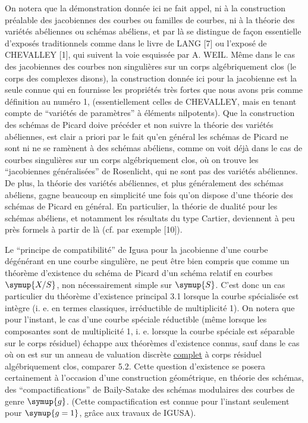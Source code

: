  On notera que la démonstration donnée ici ne fait appel,
ni à la construction préalable des jacobiennes des courbes ou familles de
courbes, ni à la théorie des variétés abéliennes ou schémas abéliens, et par là
se distingue de façon essentielle d'exposés traditionnels comme dans le livre
de LANG [7] ou l'exposé de CHEVALLEY [1], qui suivent la voie esquissée par
A. WEIL. Même dans le cas des jacobiennes des courbes non singulières sur un
corps algébriquement clos (le corps des complexes disons), la construction
donnée ici pour la jacobienne est la seule connue qui en fournisse les
propriétés très fortes que nous avons pris comme définition au numéro 1,
(essentiellement celles de CHEVALLEY, mais en tenant compte de ``variétés de
paramètres'' à éléments nilpotents). Que la construction des schémas de Picard
doive précéder et non suivre la théorie des variétés abéliennes, est clair a
priori par le fait qu'en général les schémas de Picard ne sont ni ne se
ramènent à des schémas abéliens, comme on voit déjà dans le cas de courbes
singulières sur un corps algébriquement clos, où on trouve les ``jacobiennes
généralisées'' de Rosenlicht, qui ne sont pas des variétés abéliennes. De plus,
la théorie des variétés abéliennes, et plus généralement des schémas abéliens,
gagne beaucoup en simplicité une fois qu'on dispose d'une théorie des schémas
de Picard en général. En particulier, la théorie de dualité pour les schémas
abéliens, et notamment les résultats du type Cartier, deviennent à peu près
formels à partir de là (cf. par exemple [10]).

 Le ``principe de compatibilité'' de Igusa pour la
jacobienne d'une courbe dégénérant en une courbe singulière, ne peut être bien
compris que comme un théorème d'existence du schéma de Picard d'un schéma
relatif en courbes $\symup{X/S}$, non nécessairement simple sur $\symup{S}$. C'est donc un cas
particulier du théorème d'existence principal 3.1 lorsque la courbe spécialisée
est intègre (i. e. en termes classiques, irréductible de multiplicité 1). On
notera que pour l'instant, le cas d'une courbe spéciale réductible (même
lorsque les composantes sont de multiplicité 1, i. e. lorsque la courbe spéciale
est séparable sur le corps résiduel) échappe aux théorèmes d'existence connus,
sauf dans le cas où on est sur un anneau de valuation discrète \uline{complet} à corps
résiduel algébriquement clos, comparer 5.2. Cette question d'existence se posera
certainement à l'occasion d'une construction géométrique, en théorie des
schémas, des ``compactifications'' de Baily-Satake des schémas modulaires des
courbes de genre $\symup{g}$. (Cette compactification est connue pour l'instant
seulement pour $\symup{g=1}$, grâce aux travaux de IGUSA).

